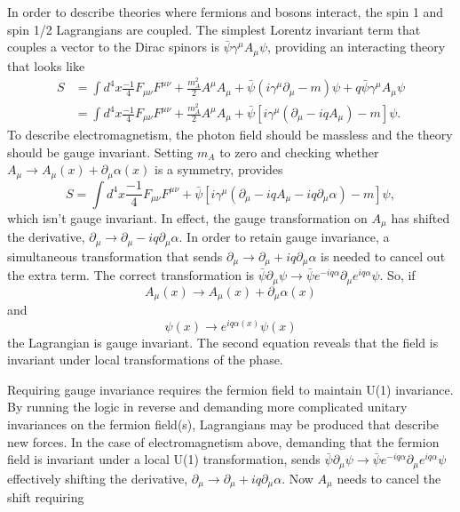 In order to describe theories where fermions and bosons interact, the spin 1 and spin 1/2 Lagrangians are coupled. The simplest Lorentz invariant term that couples a vector to the Dirac spinors is $\bar{\psi}\gamma^\mu A_\mu \psi$, providing an interacting theory that looks like 
\begin{equation}
\begin{split}
S &= \int d^4x \frac{-1}{4}F_{\mu\nu}F^{\mu\nu} + \frac{m_A^2}{2} A^\mu A_\mu + \bar{\psi}\left(i\gamma^\mu\partial_\mu - m\right)\psi + q\bar{\psi}\gamma^\mu A_\mu \psi \\
&= \int d^4x \frac{-1}{4}F_{\mu\nu}F^{\mu\nu} + \frac{m_A^2}{2} A^\mu A_\mu + \bar{\psi}\left[i\gamma^\mu\left(\partial_\mu - iqA_\mu\right)- m \right]\psi. 
\end{split}
\end{equation}
To describe electromagnetism, the photon field should be massless and the theory should be gauge invariant. Setting $m_A$ to zero and checking whether $A_\mu \rightarrow A_\mu(x) + \partial_\mu\alpha(x)$ is a symmetry, provides  
\begin{equation}
S = \int d^4x \frac{-1}{4}F_{\mu\nu}F^{\mu\nu} + \bar{\psi}\left[i\gamma^\mu\left(\partial_\mu - iqA_\mu - iq\partial_\mu\alpha\right)- m \right]\psi, 
\end{equation}
which isn't gauge invariant. In effect, the gauge transformation on $A_\mu$ has shifted the derivative, $\partial_\mu \rightarrow \partial_\mu - iq\partial_\mu\alpha$. In order to retain gauge invariance, a simultaneous transformation that sends $\partial_\mu \rightarrow \partial_\mu + iq\partial_\mu\alpha$ is needed to cancel out the extra term. The correct transformation is $\bar{\psi}\partial_\mu\psi \rightarrow \bar{\psi} e^{-iq\alpha} \partial_\mu e^{iq\alpha} \psi$. So, if 
\begin{equation}
A_\mu(x) \rightarrow A_\mu(x) + \partial_\mu\alpha(x)
\end{equation}
and
\begin{equation}
\psi(x) \rightarrow e^{iq\alpha(x)}\psi(x) 
\end{equation}
the Lagrangian is gauge invariant. The second equation reveals that the field is invariant under local transformations of the phase. 

Requiring gauge invariance requires the fermion field to maintain U(1) invariance. By running the logic in reverse and demanding more complicated unitary invariances on the fermion field(s), Lagrangians may be produced that describe new forces. In the case of electromagnetism above, demanding that the fermion field is invariant under a local U(1) transformation, sends $\bar{\psi}\partial_\mu\psi \rightarrow \bar{\psi} e^{-iq\alpha} \partial_\mu e^{iq\alpha} \psi$ effectively shifting the derivative, $\partial_\mu \rightarrow \partial_\mu + iq\partial_\mu\alpha$. Now $A_\mu$ needs to cancel the shift requiring 

